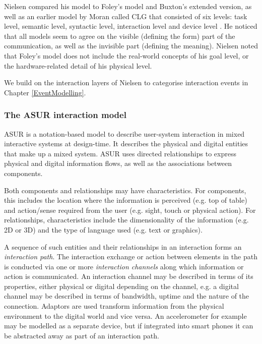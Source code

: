 Nielsen compared his model to Foley's model and Buxton's extended version, as well as an earlier model by Moran called \ac{CLG} that consisted of six levels: task level, semantic level, syntactic level, interaction level and device level \cite{Nielsen1986}. He noticed that all models seem to agree on the visible (defining the form) part of the communication, as well as the invisible part (defining the meaning). Nielsen noted that Foley's model does not include the real-world concepts of his goal level, or the hardware-related detail of his physical level.

We build on the interaction layers of Nielsen to categorise interaction events in Chapter \ref{EventModelling}.







\subsubsection{The ASUR interaction model}
\label{theasurinteractionmodel}

\ac{ASUR} is a notation-based model to describe user-system interaction in mixed interactive systems \cite{Dubois2008} at design-time. It describes the physical and digital entities that make up a mixed system. \ac{ASUR} uses directed relationships to express physical and digital information flows, as well as the associations between components.

Both components and relationships may have characteristics. For components, this includes the location where the information is perceived (e.g. top of table) and action/sense required from the user (e.g. sight, touch or physical action). For relationships, characteristics include the dimensionality of the information (e.g. 2D or 3D) and the type of language used (e.g. text or graphics).

A sequence of such entities and their relationships in an interaction forms an \emph{interaction path}. The interaction exchange or action between elements in the path is conducted via one or more \emph{interaction channels} along which information or action is communicated. An interaction channel may be described in terms of its properties, either physical or digital depending on the channel, e.g. a digital channel may be described in terms of bandwidth, uptime and the nature of the connection. Adaptors are used transform information from the physical environment to the digital world and vice versa. An accelerometer for example may be modelled as a separate device, but if integrated into smart phones it can be abstracted away as part of an interaction path. 

